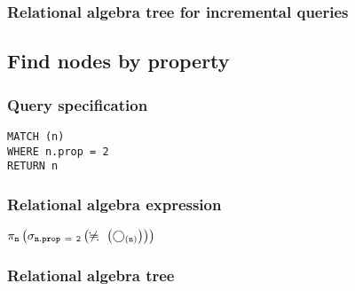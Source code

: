 
\subsubsection*{Relational algebra tree for incremental queries}


\subsection{Find nodes by property}

\subsubsection*{Query specification}

\begin{lstlisting}
MATCH (n)
WHERE n.prop = 2
RETURN n
\end{lstlisting}

\subsubsection*{Relational algebra expression}

$\projection{\var{n}} \left(\selection{\mathtt{n.prop~=~2}} \left(\alldifferent{} \left(\getvertices{n}{}\right)\right)\right)$

\subsubsection*{Relational algebra tree}


